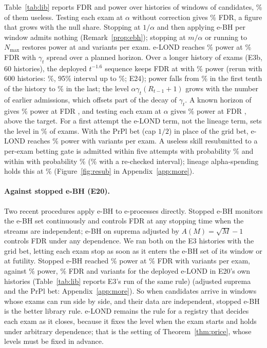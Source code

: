 Table~\ref{tab:lib} reports FDR and power over histories of \PWindows{} windows of \PWindow{} candidates, \PNullShare\% of them useless. Testing each exam at $\alpha$ without correction gives \NEThreeFdrPerExam\% FDR, a figure that grows with the null share. Stopping at $1/\alpha$ and then applying e-BH per window admits nothing (Remark~\ref{prop:ebh}); stopping at $m/\alpha$ or running to $N_{\max}$ restores power at \NEThreeNStopm{} and \NEThreeNRunMax{} variants per exam. e-LOND reaches \NEThreePowELondH\% power at \NEThreeFdrELondH\% FDR with $\gamma_t$ spread over a planned horizon. Over a longer history of \NEbT{} exams (E3b, 60 histories), the deployed $t^{-1.6}$ sequence keeps FDR at \NEbInfFdr{} with \NEbInfPow\% power (rerun with 600 histories: \NIvEbInfFdr\%, 95\% interval up to \NIvEbInfFdrHi\%; E24); power falls from \NEbInfPowFirst\% in the first tenth of the history to \NEbInfPowLast\% in the last; the level $\alpha\gamma_t(R_{t-1}+1)$ grows with the number of earlier admissions, which offsets part of the decay of $\gamma_t$. A known horizon of \NEbT{} gives \NEbHorPow\% power at FDR \NEbHorFdr{}, and testing each exam at $\alpha$ gives \NEbPerPow\% power at FDR \NEbPerFdr{}, above the target. For a first attempt the e-LOND term, not the lineage term, sets the level in \NEbElondBinds\% of exams. With the PrPl bet (cap $1/2$) in place of the grid bet, e-LOND reaches \NEThreePrplPowELond\% power with \NEThreePrplNELond{} variants per exam. A useless skill resubmitted to a per-exam betting gate is admitted within five attempts with probability \NResubFivePerExam\% and within \PResub{} with probability \NResubPerExam\% (\NResubPeekCI\% with a re-checked interval); lineage alpha-spending holds this at \NResubLineage\% (Figure~\ref{fig:resub} in Appendix~\ref{app:more}).

\paragraph{Against stopped e-BH (E20).} Two recent procedures apply e-BH to e-processes directly. Stopped e-BH \citep{wang2025stopped} monitors the e-BH set continuously and controls FDR at any stopping time when the streams are independent; e-BH on suprema adjusted by $A(M)=\sqrt M-1$ \citep{tavyrikov2025carefree} controls FDR under any dependence. We ran both on the E3 histories with the grid bet, letting each exam stop as soon as it enters the e-BH set of its window or at futility. Stopped e-BH reached \NEbhGridSebhPow\% power at \NEbhGridSebhFdr\% FDR with \NEbhGridSebhN{} variants per exam, against \NEbhGridElondPow\% power, \NEbhGridElondFdr\% FDR and \NEbhGridElondN{} variants for the deployed e-LOND in E20's own histories (Table~\ref{tab:lib} reports E3's run of the same rule) (adjusted suprema and the PrPl bet: Appendix~\ref{app:more}). So when candidates arrive in windows whose exams can run side by side, and their data are independent, stopped e-BH is the better library rule. e-LOND remains the rule for a registry that decides each exam as it closes, because it fixes the level when the exam starts and holds under arbitrary dependence; that is the setting of Theorem~\ref{thm:price}, whose levels must be fixed in advance.

